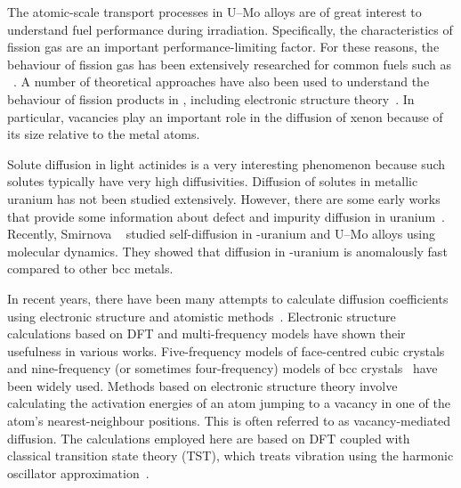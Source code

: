 The atomic-scale transport processes in U--Mo alloys are of great interest to
understand fuel performance during irradiation.
Specifically, the characteristics of fission gas are an important
performance-limiting factor. For these reasons, the behaviour of fission gas
has been extensively researched for common fuels such as
~\cite{yun2008atomic,carter1972xenon,matzke1966diffusion,
    macewan1964xenon, une1987effects}.
A number of theoretical approaches have also been used to understand the
behaviour of fission products in , including electronic structure
theory~\cite{catlow1978fission,jackson1986calculation,grimes1989calculations,
    ball1990diffusion,grimes1991stability, petit1999location,
    crocombette2002ab, freyss2006ab, andersson2011u}.
In particular, vacancies play an important role in the diffusion of xenon
because of its size relative to the metal atoms.

Solute diffusion in light actinides is a very interesting phenomenon because
such solutes typically have very high diffusivities.
Diffusion of solutes in metallic uranium has not been studied extensively.
However, there are some early works that provide some information about defect
and impurity diffusion in uranium~\cite{adda1959etude,peterson1964diffusion,
    rothman1959self, rothman1961diffusion, adda1962etude, resnick1962self,
    rothman1961self, liu2012atomic}.
Recently, Smirnova \etal~\cite{smirnova2015atomistic} studied self-diffusion in
\textgamma-uranium and U--Mo alloys using molecular dynamics.
They showed that diffusion in \textgamma-uranium is anomalously fast compared
to other bcc metals.

In recent years, there have been many attempts to calculate diffusion
coefficients using electronic structure and atomistic
methods~\cite{adams1989self, blochl1993first, blochl1990first, frank1996first,
    janotti2004solute, krvcmar2005diffusion, milman1993free, sandberg2002self}.
Electronic structure calculations based on DFT and multi-frequency models have
shown their usefulness in various works.
Five-frequency models of face-centred cubic
    crystals~\cite{lidiard1955,lidiard1960, leclaire1956} and
nine-frequency (or sometimes four-frequency) models of bcc
crystals~\cite{leclaire1970, mehrer2007diffusion} have been widely used.
Methods based on electronic structure theory involve calculating the activation
energies of an atom jumping to a vacancy in one of the atom's nearest-neighbour
positions. This is often referred to as vacancy-mediated diffusion.
The calculations employed here are based on DFT coupled with classical
transition state theory (TST), which treats vibration using the
harmonic oscillator
approximation~\cite{vineyard1954theory, vineyard1957frequency}.


